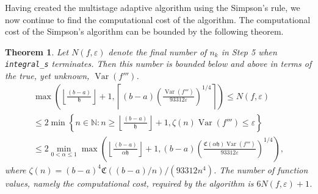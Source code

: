 \documentclass{iitthesis}
\DeclareMathOperator{\Var}{Var}
\newtheorem{theorem}{Theorem}
\theoremstyle{definition}
\theoremstyle{remark}
\begin{document}
Having created the multistage adaptive algorithm using the Simpson's rule, we now continue to find the computational cost of the algorithm. The computational cost of the Simpson's algorithm can be bounded by the following theorem.
\begin{theorem}\label{uppbndcostSimp}
    Let $N(f,\varepsilon)$ denote the final number of $n_k$ in Step 5 when {\tt integral\_s} terminates. Then this number is bounded below and above in terms of the true, yet unknown, $\Var(f''')$.
    \begin{multline}\label{uppbndcostineqsim}
        \max\left(\left\lfloor\frac{(b-a)}{\mathfrak{h}}\right\rfloor+1,\left\lceil(b-a)\left(\frac{\Var(f''')}{93312\varepsilon}\right)^{1/4}\right\rceil\right)\leq N(f,\varepsilon)\\ \leq 2\min\left\{n\in\mathbb{N}:n\geq\left\lfloor\frac{(b-a)}{\mathfrak{h}}\right\rfloor+1,\zeta(n)\Var(f''')\leq\varepsilon\right\}\\ \leq 2\min_{0<\alpha\leq1}\max\left(\left\lfloor\frac{(b-a)}{\alpha\mathfrak{h}}\right\rfloor+1,(b-a)\left(\frac{\mathfrak{C}(\alpha\mathfrak{h})\Var(f''')}{93312\varepsilon}\right)^{1/4}\right),
    \end{multline}
    where $\zeta(n)=(b-a)^4\mathfrak{C}((b-a)/n)/(93312n^4)$. The number of function values, namely the computational cost, required by the algorithm is $6N(f,\varepsilon)+1$.
\end{theorem}
\end{document}
